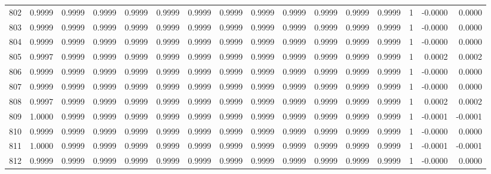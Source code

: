 \begin{tabular}{lrrrrrrrrrrrrrrr}
802 &      0.9999 &  0.9999 &  0.9999 &  0.9999 &  0.9999 &  0.9999 &  0.9999 &  0.9999 &  0.9999 &  0.9999 &   0.9999 &     0.9999 &      1 &                   -0.0000 &                     0.0000 \\
803 &      0.9999 &  0.9999 &  0.9999 &  0.9999 &  0.9999 &  0.9999 &  0.9999 &  0.9999 &  0.9999 &  0.9999 &   0.9999 &     0.9999 &      1 &                   -0.0000 &                     0.0000 \\
804 &      0.9999 &  0.9999 &  0.9999 &  0.9999 &  0.9999 &  0.9999 &  0.9999 &  0.9999 &  0.9999 &  0.9999 &   0.9999 &     0.9999 &      1 &                   -0.0000 &                     0.0000 \\
805 &      0.9997 &  0.9999 &  0.9999 &  0.9999 &  0.9999 &  0.9999 &  0.9999 &  0.9999 &  0.9999 &  0.9999 &   0.9999 &     0.9999 &      1 &                    0.0002 &                     0.0002 \\
806 &      0.9999 &  0.9999 &  0.9999 &  0.9999 &  0.9999 &  0.9999 &  0.9999 &  0.9999 &  0.9999 &  0.9999 &   0.9999 &     0.9999 &      1 &                   -0.0000 &                     0.0000 \\
807 &      0.9999 &  0.9999 &  0.9999 &  0.9999 &  0.9999 &  0.9999 &  0.9999 &  0.9999 &  0.9999 &  0.9999 &   0.9999 &     0.9999 &      1 &                   -0.0000 &                     0.0000 \\
808 &      0.9997 &  0.9999 &  0.9999 &  0.9999 &  0.9999 &  0.9999 &  0.9999 &  0.9999 &  0.9999 &  0.9999 &   0.9999 &     0.9999 &      1 &                    0.0002 &                     0.0002 \\
809 &      1.0000 &  0.9999 &  0.9999 &  0.9999 &  0.9999 &  0.9999 &  0.9999 &  0.9999 &  0.9999 &  0.9999 &   0.9999 &     0.9999 &      1 &                   -0.0001 &                    -0.0001 \\
810 &      0.9999 &  0.9999 &  0.9999 &  0.9999 &  0.9999 &  0.9999 &  0.9999 &  0.9999 &  0.9999 &  0.9999 &   0.9999 &     0.9999 &      1 &                   -0.0000 &                     0.0000 \\
811 &      1.0000 &  0.9999 &  0.9999 &  0.9999 &  0.9999 &  0.9999 &  0.9999 &  0.9999 &  0.9999 &  0.9999 &   0.9999 &     0.9999 &      1 &                   -0.0001 &                    -0.0001 \\
812 &      0.9999 &  0.9999 &  0.9999 &  0.9999 &  0.9999 &  0.9999 &  0.9999 &  0.9999 &  0.9999 &  0.9999 &   0.9999 &     0.9999 &      1 &                   -0.0000 &                     0.0000 \\

\end{tabular}
